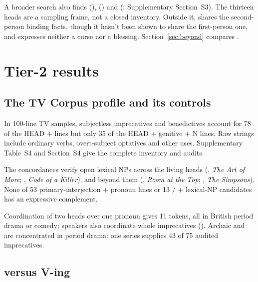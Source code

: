 \documentclass[12pt]{article}
\begin{document}
A broader search also finds  (),  () and  (; Supplementary Section~S3). The thirteen heads are a sampling frame, not a closed inventory. Outside it,  shares the second-person binding facts, though it hasn't been shown to share the first-person one, and  expresses neither a curse nor a blessing. Section~\ref{sec:beyond} compares .

\section{Tier-2 results}
\label{sec:tier2}

\subsection{The TV Corpus profile and its controls}
\label{sec:tv-profile}

In 100-line TV samples, subjectless imprecatives and benedictives account for 78 of the HEAD +  lines but only 35 of the HEAD + genitive + N lines. Raw strings include ordinary verbs, overt-subject optatives and other uses. Supplementary Table~S4 and Section~S4 give the complete inventory and audits.

The concordances verify open lexical NPs across the living heads (, \emph{The Art of More}; , \emph{Code of a Killer}), and beyond them (, \emph{Room at the Top}; , \emph{The Simpsons}). None of 53 primary-interjection + pronoun lines or 13 / + lexical-NP candidates has an expressive complement.

Coordination of two heads over one pronoun gives 11  tokens, all in British period drama or comedy; speakers also coordinate whole imprecatives (). Archaic  and  are concentrated in period drama: one series supplies 43 of 75 audited  imprecatives.

\subsection{ versus  V-ing}
\label{sec:dissoc}
\end{document}
